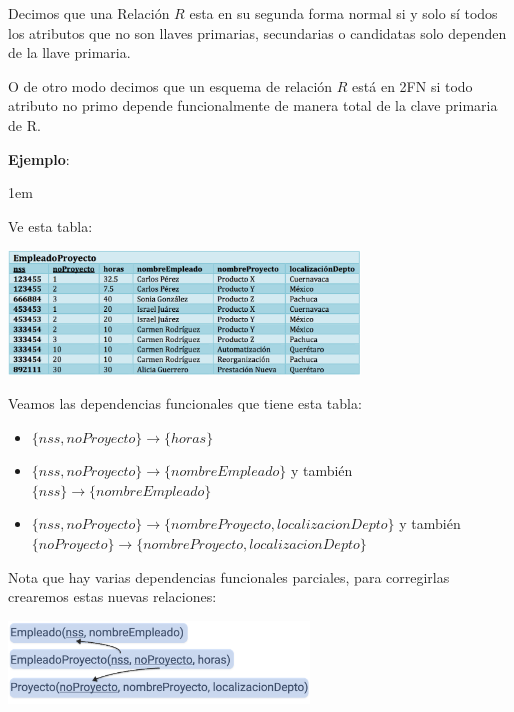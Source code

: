 \documentclass[12pt, fleqn]{report}                             %
\newenvironment{SmallIndentation}[1][0.75em]                    %
    {\begin{adjustwidth}{#1}{}\begin{footnotesize}}                 %
    {\end{footnotesize}\end{adjustwidth}}                           %
\begin{document}
                Decimos que una Relación $R$ esta en su segunda forma normal
                si y solo sí todos los atributos que no son llaves primarias, secundarias
                o candidatas solo dependen de la llave primaria.

                O de otro modo decimos que un esquema de relación $R$ está en 2FN si
                todo atributo no primo depende funcionalmente de manera total de la
                clave primaria de R.

                \clearpage
                \textbf{Ejemplo}:
                \begin{SmallIndentation}[1em]

                    Ve esta tabla:

                    \includegraphics[width=0.70\textwidth]{EjemploParaNormalizarA2FN}
                    
                    Veamos las dependencias funcionales que tiene esta tabla:
                    \begin{itemize}
                        \item $\{nss, noProyecto\} \to \{horas\}$
                        \item $\{nss, noProyecto\} \to \{nombreEmpleado\}$ y también
                            $\{nss\} \to \{nombreEmpleado\}$ 
                        \item $\{nss, noProyecto\} \to \{nombreProyecto, localizacionDepto\}$ y también \\
                            $\{noProyecto\} \to \{nombreProyecto, localizacionDepto\}$
                    \end{itemize}

                    Nota que hay varias dependencias funcionales parciales, para corregirlas crearemos
                    estas nuevas relaciones:

                    \includegraphics[width=0.60\textwidth]{EjemploParaNormalizarA2FN2}

                \end{SmallIndentation}
                 
\end{document}
